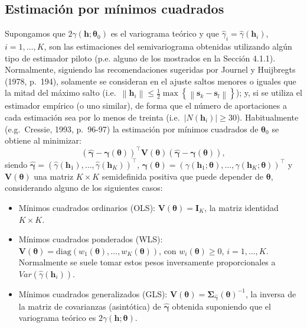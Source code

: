 \documentclass[
  spanish,
]{book}
\theoremstyle{break}
\theoremstyle{definition}
\theoremstyle{definition}
\theoremstyle{definition}
\theoremstyle{definition}
\theoremstyle{remark}
\begin{document}
\hypertarget{ls-fit}{%
\subsection{Estimación por mínimos cuadrados}\label{ls-fit}}

Supongamos que \(2\gamma(\mathbf{h};\boldsymbol{\theta}_{0})\) es el variograma teórico y que \(\hat{\gamma}_{i} =\hat{\gamma}(\mathbf{h}_{i})\), \(i = 1,\ldots,K\), son las estimaciones del semivariograma obtenidas utilizando algún tipo de estimador piloto (p.e. alguno de los mostrados en la Sección 4.1.1).
Normalmente, siguiendo las recomendaciones sugeridas por Journel y Huijbregts (1978, p.~194), solamente se consideran en el ajuste saltos menores o iguales que la mitad del máximo salto (i.e.~\(\left\| \mathbf{h}_{i} \right\| \leq \frac{1}{2} \max \left\{ \left\| \mathbf{s}_{k} -\mathbf{s}_{l} \right\| \right\}\)); y, si se utiliza el estimador empírico (o uno similar), de forma que el número de aportaciones a cada estimación sea por lo menos de treinta (i.e.~\(\left| N(\mathbf{h}_{i})\right| \geq 30\)).
Habitualmente (e.g.~Cressie, 1993, p.~96-97) la estimación por mínimos cuadrados de \(\boldsymbol{\theta}_{0}\) se obtiene al minimizar:
\begin{equation} 
  \left( \hat{\boldsymbol{\gamma}} - \boldsymbol{\gamma}(\boldsymbol{\theta})\right)^{\top } \mathbf{V}(\boldsymbol{\theta})\left( \hat{\boldsymbol{\gamma}} - \boldsymbol{\gamma}(\boldsymbol{\theta})\right),
  \label{eq:ls-obj}
\end{equation}
siendo \(\hat{\boldsymbol{\gamma}} =(\hat{\gamma}(\mathbf{h}_1),\ldots,\hat{\gamma} (\mathbf{h}_{K}))^\top\), \(\boldsymbol{\gamma}(\boldsymbol{\theta})=(\gamma(\mathbf{h}_1 ;\boldsymbol{\theta}),\ldots,\gamma(\mathbf{h}_{K} ;\boldsymbol{\theta}))^\top\)
y \(\mathbf{V}(\boldsymbol{\theta})\) una matriz \(K\times K\) semidefinida positiva que puede
depender de \(\boldsymbol{\theta}\), considerando alguno de los siguientes casos:

\begin{itemize}
\item
  Mínimos cuadrados ordinarios (OLS): \(\mathbf{V}(\boldsymbol{\theta}) = \mathbf{I}_{K}\),
  la matriz identidad \(K\times K\).
\item
  Mínimos cuadrados ponderados (WLS): \(\mathbf{V}(\boldsymbol{\theta}) = \text{diag}(w_1 (\boldsymbol{\theta}),\ldots,w_{K}(\boldsymbol{\theta}))\),
  con \(w_{i}(\boldsymbol{\theta})\geq 0\), \(i=1,\ldots,K\).
  Normalmente se suele tomar estos pesos inversamente proporcionales a \(Var(\hat{\gamma}(\mathbf{h}_{i}))\).
\item
  Mínimos cuadrados generalizados (GLS): \(\mathbf{V}(\boldsymbol{\theta})=\boldsymbol{\Sigma}_{\hat{\boldsymbol{\gamma}}} (\boldsymbol{\theta})^{-1}\),
  la inversa de la matriz de covarianzas (asintótica) de \(\hat{\boldsymbol{\gamma}}\) obtenida suponiendo que el variograma teórico es \(2\gamma(\mathbf{h};\boldsymbol{\theta})\).
\end{itemize}
\end{document}
